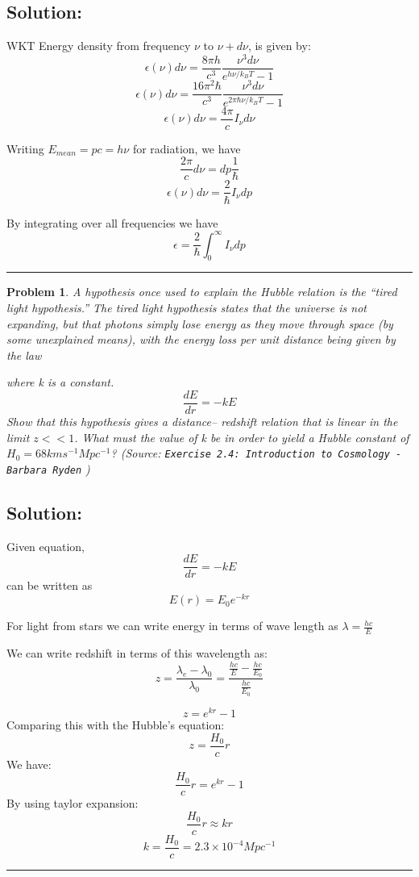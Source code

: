\documentclass[11pt]{article}
\newenvironment{solution}{\subsection*{Solution:}}{\vspace{0.5cm} \hrule \vspace{0.7cm}}
\newtheorem{problem}{Problem}
\begin{document}
\begin{solution}
	WKT Energy density from frequency $\nu$ to $\nu+d\nu$, is given by:
	$$ \epsilon(\nu)d\nu = \frac{8\pi h}{c^3}\frac{\nu^3d\nu}{e^{h\nu/k_BT} - 1} $$
	$$ \epsilon(\nu) d\nu= \frac{16\pi^2\hbar}{c^3}\frac{\nu^3d\nu}{e^{2\pi
	\hbar \nu/k_BT} - 1} $$
	$$ \epsilon(\nu) d\nu= \frac{4\pi}{c} I_\nu d\nu$$

	Writing $E_{mean} = pc = h\nu$ for radiation, we have
	$$\frac{2\pi}{c} d\nu = dp \frac{1}{\hbar} $$
	$$ \epsilon(\nu) d\nu= \frac{2}{\hbar} I_\nu dp$$

	By integrating over all frequencies we have
	$$ \epsilon = \frac{2}{\hbar} \int_{0}^{\infty} I_\nu dp$$

\end{solution}

\begin{problem}
	A hypothesis once used to explain the Hubble relation is the “tired
	light
	hypothesis.” The tired light hypothesis states that the universe is not
	expanding, but that photons simply lose energy as they move through
	space (by some unexplained means), with the energy loss per unit
	distance being given by the law

	where k is a constant.
	$$ \frac{dE}{dr} = -kE $$
	Show that this hypothesis gives a distance–
	redshift relation that is linear in the limit $z <<1$. What must the value
	of
	k be in order to yield a Hubble constant of $H_0 = 68 km s^{-1} Mpc^{-1}$?
        (Source: \texttt{Exercise 2.4: Introduction to Cosmology - Barbara Ryden} )

\end{problem}


\begin{solution}
        Given equation,
	$$ \frac{dE}{dr} = -kE $$
	can be written as
	$$ E(r) = E_0 e^{-kr} $$

	For light from stars we can write energy in terms of wave length as
	$\lambda  = \frac{hc}{E}$

	We can write redshift in terms of this wavelength as:
	$$ z = \frac{\lambda_e - \lambda_0}{ \lambda_0 } = \frac{\frac{hc}{E} -
	\frac{hc}{E_0}}{ \frac{hc}{E_0}}$$

	$$ z = e^{kr} - 1 $$
	Comparing this with the Hubble's equation:
	$$ z = \frac{H_0}{c} r  $$
        We have:
	$$ \frac{H_0}{c}r = e^{kr} - 1 $$
	By using taylor expansion:
	$$ \frac{H_0}{c}r \approx kr $$
	$$ k = \frac{H_0}{c} = 2.3 \times 10^{-4} Mpc^{-1}$$

\end{solution}
\end{document}
